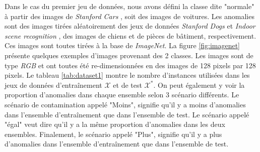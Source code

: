 Dans le cas du premier jeu de données, nous avons défini la classe dite "normale" à partir des images de \textit{Stanford Cars} \citep{KrauseStarkDengFei-Fei_3DRR2013}, soit des images de voitures. Les anomalies sont des images tirées aléatoirement des jeux de données \textit{Stanford Dogs} \citep{KhoslaYaoJayadevaprakashFeiFei_FGVC2011} et \textit{Indoor scene recognition} \citep{5206537}, des images de chiens et de pièces de bâtiment, respectivement. Ces images sont toutes tirées à la base de \textit{ImageNet}. La figure \ref{fig:imagenet} présente quelques exemples d'images provenant des 2 classes. Les images sont de type \textit{RGB} et ont toutes été re-dimensionnées en des images de 128 pixels par 128 pixels. Le tableau \ref{tab:dataset1} montre le nombre d'instances utilisées dans les jeux de données d'entraînement $\mathcal{X}$ et de test $\mathcal{X^*}$. On peut également y voir la proportion d'anomalies dans chaque ensemble selon 3 scénario différents. Le scénario de contamination appelé "Moins", signifie qu'il y a moins d'anomalies dans l'ensemble d'entraînement que dans l'ensemble de test. Le scénario appelé "égal" veut dire qu'il y a la même proportion d'anomalies dans les deux ensembles. Finalement, le scénario appelé "Plus", signifie qu'il y a plus d'anomalies dans l'ensemble d'entraînement que dans l'ensemble de test.

